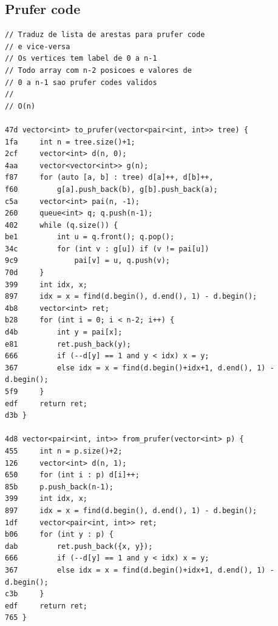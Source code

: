 \documentclass[11pt, a4paper, twoside]{article}
\begin{document}
\subsection{Prufer code}
\begin{lstlisting}
// Traduz de lista de arestas para prufer code
// e vice-versa
// Os vertices tem label de 0 a n-1
// Todo array com n-2 posicoes e valores de
// 0 a n-1 sao prufer codes validos
// 
// O(n)

47d vector<int> to_prufer(vector<pair<int, int>> tree) {
1fa 	int n = tree.size()+1;
2cf 	vector<int> d(n, 0);
4aa 	vector<vector<int>> g(n);
f87 	for (auto [a, b] : tree) d[a]++, d[b]++,
f60 		g[a].push_back(b), g[b].push_back(a);
c5a 	vector<int> pai(n, -1);
260 	queue<int> q; q.push(n-1);
402 	while (q.size()) {
be1 		int u = q.front(); q.pop();
34c 		for (int v : g[u]) if (v != pai[u])
9c9 			pai[v] = u, q.push(v);
70d 	}
399 	int idx, x;
897 	idx = x = find(d.begin(), d.end(), 1) - d.begin();
4b8 	vector<int> ret;
b28 	for (int i = 0; i < n-2; i++) {
d4b 		int y = pai[x];
e81 		ret.push_back(y);
666 		if (--d[y] == 1 and y < idx) x = y;
367 		else idx = x = find(d.begin()+idx+1, d.end(), 1) - d.begin();
5f9 	}
edf 	return ret;
d3b }

4d8 vector<pair<int, int>> from_prufer(vector<int> p) {
455 	int n = p.size()+2;
126 	vector<int> d(n, 1);
650 	for (int i : p) d[i]++;
85b 	p.push_back(n-1);
399 	int idx, x;
897 	idx = x = find(d.begin(), d.end(), 1) - d.begin();
1df 	vector<pair<int, int>> ret;
b06 	for (int y : p) {
dab 		ret.push_back({x, y});
666 		if (--d[y] == 1 and y < idx) x = y;
367 		else idx = x = find(d.begin()+idx+1, d.end(), 1) - d.begin();
c3b 	}
edf 	return ret;
765 }

\end{lstlisting}
\end{document}
